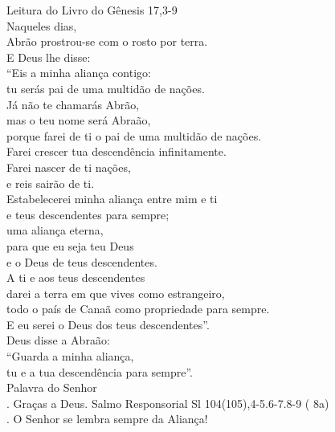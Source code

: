 \documentclass{book}
\begin{document}
\begin{flushleft}
    Leitura do Livro do Gênesis
    \hspace{\fill}
    \textcolor{VioletRed2}{17,3-9}
    \vspace{.2cm} \\
    Naqueles dias, \\
    Abrão prostrou-se com o rosto por terra. \\
    E Deus lhe disse: \\
    ``Eis a minha aliança contigo: \\
    tu serás pai de uma multidão de nações. \\
    Já não te chamarás Abrão, \\
    mas o teu nome será Abraão, \\
    porque farei de ti o pai de uma multidão de nações. \\
    Farei crescer tua descendência infinitamente. \\
    Farei nascer de ti nações, \\
    e reis sairão de ti. \\
    Estabelecerei minha aliança entre mim e ti \\
    e teus descendentes para sempre; \\
    uma aliança eterna, \\
    para que eu seja teu Deus \\
    e o Deus de teus descendentes. \\
    A ti e aos teus descendentes \\
    darei a terra em que vives como estrangeiro, \\
    todo o país de Canaã como propriedade para sempre. \\
    E eu serei o Deus dos teus descendentes''. \\
    Deus disse a Abraão: \\
    ``Guarda a minha aliança, \\
    tu e a tua descendência para sempre''.
    \vspace{.2cm} \\
    Palavra do Senhor \\
    {\color{VioletRed2} \Rbar.} Graças a Deus.
    \newpage
    \textcolor{VioletRed2}{Salmo Responsorial
        \hspace{\fill} Sl 104(105),4-5.6-7.8-9 (\RbarRed{} 8a)}
    \vspace{.2cm} \\
    {\color{VioletRed2} \Rbar.} O Senhor se lembra sempre da Aliança!

\end{flushleft}
\end{document}
